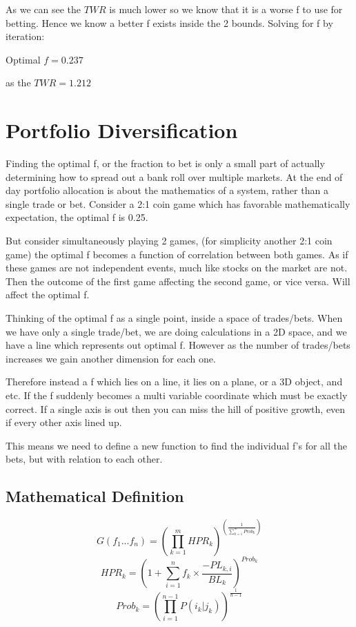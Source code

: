 \documentclass[12pt]{article}
\begin{document}
    As we can see the \(TWR\) is much lower so we know that it is a worse f to use for betting. Hence
    we know a better f exists inside the 2 bounds. Solving for f by iteration:

    Optimal \(f = 0.237\)

    as the \(TWR = 1.212\)

\section{Portfolio Diversification}

    Finding the optimal f, or the fraction to bet is only a small part of actually determining 
    how to spread out a bank roll over multiple markets. At the end of day portfolio allocation 
    is about the mathematics of a system, rather than a single trade or bet. Consider a 2:1
    coin game which has favorable mathematically expectation, the optimal f is 0.25.

    But consider simultaneously playing 2 games, {(for simplicity another 2:1 coin game)} the 
    optimal f becomes a function of correlation between both games. As if these games are not 
    independent events, much like stocks on the market are not. Then the outcome of the first 
    game affecting the second game, or vice versa. Will affect the optimal f.

    Thinking of the optimal f as a single point, inside a space of trades/bets. When we have 
    only a single trade/bet, we are doing calculations in a 2D space, and we have a line which 
    represents out optimal f. However as the number of trades/bets increases we gain another 
    dimension for each one.

    Therefore instead a f which lies on a line, it lies on a plane, or a 3D object, and etc. If 
    the f suddenly becomes a multi variable coordinate which must be exactly correct. If a 
    single axis is out then you can miss the hill of positive growth, even if every other axis 
    lined up.

    This means we need to define a new function to find the individual f's for all the bets,
    but with relation to each other.

\subsection{Mathematical Definition}

    \begin{equation}\label{eq:G}
        G(f_1...f_n) = \left( \displaystyle\prod^{m}_{k=1} HPR_k \right) ^{ \left( \displaystyle\frac{1}{\sum^{m}_{k=1}Prob_k} \right)}
    \end{equation}
    \begin{equation}\label{eq:HPR_k}
        HPR_k = \left( 1 +  \displaystyle\sum^{n}_{i=1} f_k \times \frac{- PL_{k,i}}{BL_k} \right) ^{Prob_k}
    \end{equation}
    \begin{equation}\label{eq:Prob_k}
        Prob_k = \left( \displaystyle\prod^{n - 1}_{i=1} P(i_k | j_k)\right)^{\frac{1}{n - 1}}
    \end{equation}
\end{document}
